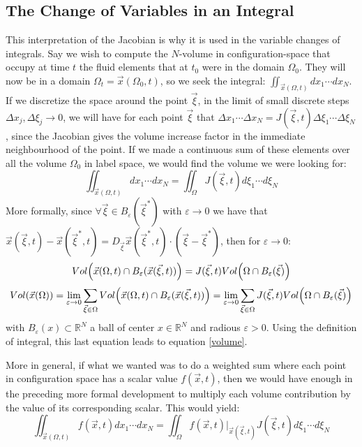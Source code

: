 \documentclass[11pt, a4paper]{article} %
\newcommand{\R}{\mathbb{R}} %
\begin{document}
\subsection*{ The Change of Variables in an Integral\vspace{-0.2cm}}
This interpretation of the Jacobian is why it is used in the variable changes of integrals. Say we wish to compute the $N$-volume in configuration-space that occupy at time $t$ the fluid elements that at $t_0$ were in the domain $\Omega_0$. They will now be in a domain $\Omega_t=\vec{x}(\Omega_0,t)$, so we seek the integral: $\iint_{\vec{x}(\Omega,t)}dx_1\cdots dx_N$. If we discretize the space around the point $\vec{\xi}$, in the limit of small discrete steps $\Delta x_j, \Delta \xi_j \rightarrow 0$, we will have for each point $\vec{\xi}$ that $\Delta x_1\cdots \Delta x_N= J(\vec{\xi},t)\Delta \xi_1\cdots \Delta\xi_N$, since the Jacobian gives the volume increase factor in the immediate neighbourhood of the point. If we made a continuous sum of these elements over all the volume $\Omega_0$ in label space, we would find the volume we were looking for:
\begin{equation}\label{volume}
\iint_{\vec{x}(\Omega,t)}dx_1\cdots dx_N=\iint_{\Omega} J(\vec{\xi},t) d\xi_1\cdots d\xi_N
\end{equation}
More formally, since $\forall \vec{\xi}\in B_\varepsilon(\vec{\xi}^*)$ with $\varepsilon\rightarrow 0$ we have that $\vec{x}(\vec{\xi},t)-\vec{x}(\vec{\xi}^*,t)= D_{\vec{\xi}}\vec{x}(\vec{\xi}^*,t)\cdot (\vec{\xi}-\vec{\xi}^*)$, then for $\varepsilon \rightarrow 0$:
\begin{equation}
Vol\qty(\vec{x}(\Omega,t)\cap B_\varepsilon(\vec{x}(\vec{\xi},t)))=J(\vec{\xi},t)Vol\qty(\Omega \cap B_\varepsilon (\vec{\xi}))
\end{equation}
\begin{equation}
Vol\qty(\vec{x}(\Omega))=\lim_{ \varepsilon\rightarrow 0} \sum_{\vec{\xi}\in\Omega} Vol\qty(\vec{x}(\Omega,t)\cap B_\varepsilon(\vec{x}(\vec{\xi},t)))=\lim_{ \varepsilon\rightarrow 0} \sum_{\vec{\xi}\in\Omega} J(\vec{\xi},t)Vol\qty(\Omega \cap B_\varepsilon (\vec{\xi}))
\end{equation}
with $B_\varepsilon(x)\subset \R^N$ a ball of center $x\in\R^N$ and radious $\varepsilon>0$. Using the definition of integral, this last equation leads to equation \eqref{volume}.

More in general, if what we wanted was to do a weighted sum where each point in configuration space has a scalar value $f(\vec{x},t)$, then we would have enough in the preceding more formal development to multiply each volume contribution by the value of its corresponding scalar. This would yield:
\begin{equation}\label{integralChange}
\iint_{\vec{x}(\Omega,t)}f(\vec{x},t)dx_1\cdots dx_N=\iint_{\Omega} f(\vec{x},t)\Big\rvert_{\vec{x}(\vec{\xi},t)}J(\vec{\xi},t) d\xi_1\cdots d\xi_N
\end{equation}
\end{document}
